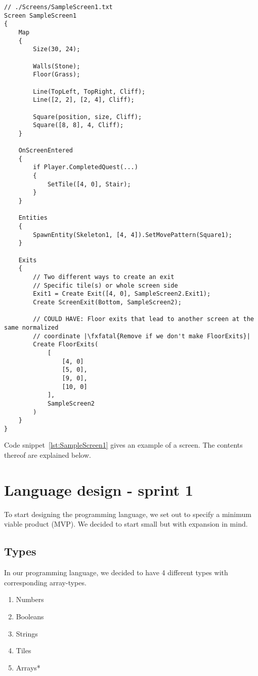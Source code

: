 \begin{lstlisting}[caption={Example screen}, label={lst:SampleScreen1},escapechar=|]
// ./Screens/SampleScreen1.txt
Screen SampleScreen1 
{
    Map 
    {
        Size(30, 24);

        Walls(Stone); 
        Floor(Grass);

        Line(TopLeft, TopRight, Cliff);
        Line([2, 2], [2, 4], Cliff);

        Square(position, size, Cliff);
        Square([8, 8], 4, Cliff);
    }

    OnScreenEntered
    {
        if Player.CompletedQuest(...) 
        {
            SetTile([4, 0], Stair);
        }
    }

    Entities
    {
        SpawnEntity(Skeleton1, [4, 4]).SetMovePattern(Square1);
    }
    
    Exits 
    {
        // Two different ways to create an exit
        // Specific tile(s) or whole screen side
        Exit1 = Create Exit([4, 0], SampleScreen2.Exit1);
        Create ScreenExit(Bottom, SampleScreen2);
    
        // COULD HAVE: Floor exits that lead to another screen at the same normalized 
        // coordinate |\fxfatal{Remove if we don't make FloorExits}|
        Create FloorExits(  
            [ 
                [4, 0] 
                [5, 0], 
                [9, 0], 
                [10, 0] 
            ],
            SampleScreen2
        )
    }
}
\end{lstlisting}

Code snippet~\ref{lst:SampleScreen1} gives an example of a screen. The contents thereof are explained below.

\section{Language design - sprint 1}

To start designing the programming language, we set out to specify a minimum viable product (MVP). We decided to start small but with expansion in mind.

\subsection{Types}
In our programming language, we decided to have 4 different types with corresponding array-types.

\begin{multicols}{3}
\begin{enumerate}
    \item Numbers\label{item:numbertype}
    \item Booleans\label{item:booleantype}
    \item Strings\label{item:stringtype}
    \item Tiles\label{item:tiletype}
    \item Arrays*\label{item:arraytype}
\end{enumerate}
\end{multicols}


